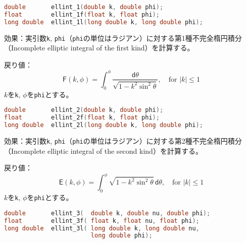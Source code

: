 \bgroup
\begin{lstlisting}[language=C++, aboveskip=0.0zw]
double       ellint_1(double k, double phi);
float        ellint_1f(float k, float phi);
long double  ellint_1l(long double k, long double phi);
\end{lstlisting}
\egroup

\noindent
\textsf{効果}：実引数\lstinline!k!,
\lstinline!phi!（\lstinline!phi!の単位はラジアン）に対する第1種不完全楕円積分（Incomplete
elliptic integral of the first kind）を計算する。

\noindent
\textsf{戻り値}：
\[
  \mathsf{F}(k, \phi) =
  \int_0^\phi \! \frac{\mathsf{d}\theta}
                      {\sqrt{1 - k^2 \sin^2 \theta}},
       \quad \mbox{for $|k| \le 1$}
\]
\hspace*{3em}\(k\)を\lstinline!k!, \(\phi\)を\lstinline!phi!とする。

%

\bgroup
\begin{lstlisting}[language=C++, aboveskip=0.0zw]
double       ellint_2(double k, double phi);
float        ellint_2f(float k, float phi);
long double  ellint_2l(long double k, long double phi);
\end{lstlisting}
\egroup

\noindent
\textsf{効果}：実引数\lstinline!k!,
\lstinline!phi!（\lstinline!phi!の単位はラジアン）に対する第2種不完全楕円積分（Incomplete
elliptic integral of the second kind）を計算する。

\noindent
\textsf{戻り値}：
\[
  \mathsf{E}(k, \phi) =
  \int_0^\phi \! \sqrt{1 - k^2 \sin^2 \theta} \, \mathsf{d}\theta,
       \quad \mbox{for $|k| \le 1$}
\]
\hspace*{3em}\(k\)を\lstinline!k!, \(\phi\)を\lstinline!phi!とする。

%

\bgroup
\begin{lstlisting}[language=C++, aboveskip=0.0zw]
double       ellint_3(  double k, double nu, double phi);
float        ellint_3f( float k, float nu, float phi);
long double  ellint_3l( long double k, long double nu,
                        long double phi);
\end{lstlisting}
\egroup

